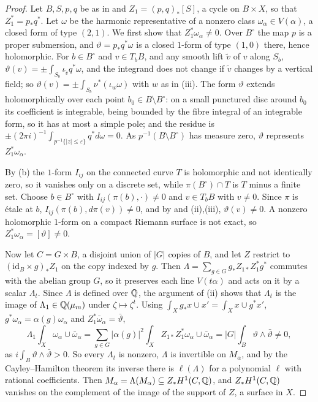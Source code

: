 \begin{proof}
Let $B,S,p,q$ be as in  and $Z_{1}=(p,q)_{*}[S]$, a
cycle on $B\times X$, so that $Z_{1}^{*}=p_{*}q^{*}$. Let $\omega$ be the
harmonic representative of a nonzero class $\omega_{\alpha}\in V(\alpha)$, a
closed form of type $(2,1)$. We first show that $Z_{1}^{*}\omega_{\alpha}\ne
0$. Over $B^{\circ}$ the map $p$ is a proper submersion, and
$\vartheta=p_{*}q^{*}\omega$ is a closed $1$-form of type $(1,0)$ there,
hence holomorphic. For $b\in B^{\circ}$ and $v\in T_{b}B$, and any smooth
lift $\tilde v$ of $v$ along $S_{b}$, $\vartheta(v)=\pm\int_{S_{b}}
\iota_{\tilde v}q^{*}\omega$, and the integrand does not change if $\tilde v$
changes by a vertical field; so $\vartheta(v)=\pm\int_{S_{b}}\nu^{*}
(\iota_{w}\omega)$ with $w$ as in (iii). The form
$\vartheta$ extends holomorphically over each point $b_{0}\in B\setminus
B^{\circ}$: on a small punctured disc around $b_{0}$ its coefficient is
integrable, being bounded by the fibre integral of an integrable form, so it
has at most a simple pole; and the residue is $\pm(2\pi i)^{-1}
\int_{p^{-1}\{|z|\le\varepsilon\}}q^{*}d\omega=0$. As $p^{-1}(B\setminus
B^{\circ})$ has measure zero, $\vartheta$ represents $Z_{1}^{*}
\omega_{\alpha}$.

By (b) the $1$-form $I_{ij}$ on the connected curve $T$ is
holomorphic and not identically zero, so it vanishes only on a discrete set,
while $\pi(B^{\circ})\cap T$ is $T$ minus a finite set. Choose $b\in
B^{\circ}$ with $I_{ij}(\pi(b),\cdot)\ne0$ and $v\in T_{b}B$ with $v\ne0$.
Since $\pi$ is \'etale at $b$, $I_{ij}(\pi(b),d\pi(v))\ne0$, and by
 and (ii),(iii), $\vartheta(v)\ne0$.
A nonzero holomorphic $1$-form on a compact Riemann surface is not exact, so
$Z_{1}^{*}\omega_{\alpha}=[\vartheta]\ne0$.

Now let $C=G\times B$, a disjoint union of $|G|$ copies of $B$, and let $Z$
restrict to $(\mathrm{id}_{B}\times g)_{*}Z_{1}$ on the copy indexed by
$g$. Then $\Lambda=\sum_{g\in G}g_{*}Z_{1*}Z_{1}^{*}g^{*}$ commutes with
the abelian group $G$, so it preserves each line $V(t\alpha)$ and acts on it
by a scalar $\Lambda_{t}$. Since $\Lambda$ is defined over $\mathbb{Q}$, the
argument of (ii) shows that $\Lambda_{t}$ is the
image of $\Lambda_{1}\in\mathbb{Q}(\mu_{m})$ under $\zeta\mapsto\zeta^{t}$. Using
$\int_{X}g_{*}x\cup x'=\int_{X}x\cup g^{*}x'$, $g^{*}\omega_{\alpha}=
\alpha(g)\omega_{\alpha}$ and $Z_{1}^{*}\bar\omega_{\alpha}=\bar\vartheta$,
\[
  \Lambda_{1}\int_{X}\omega_{\alpha}\cup\bar\omega_{\alpha}
  =\sum_{g\in G}|\alpha(g)|^{2}\int_{X}Z_{1*}Z_{1}^{*}\omega_{\alpha}\cup
  \bar\omega_{\alpha}=|G|\int_{B}\vartheta\wedge\bar\vartheta\ne0,
\]
as $i\int_{B}\vartheta\wedge\bar\vartheta>0$. So every $\Lambda_{t}$ is
nonzero, $\Lambda$ is invertible on $M_{\alpha}$, and by the
Cayley--Hamilton theorem its inverse there is $\ell(\Lambda)$ for a
polynomial $\ell$ with rational coefficients. Then $M_{\alpha}=
\Lambda(M_{\alpha})\subseteq Z_{*}H^{1}(C,\mathbb{Q})$, and $Z_{*}H^{1}(C,\mathbb{Q})$
vanishes on the complement of the image of the support of $Z$, a surface in
$X$.
\end{proof}

